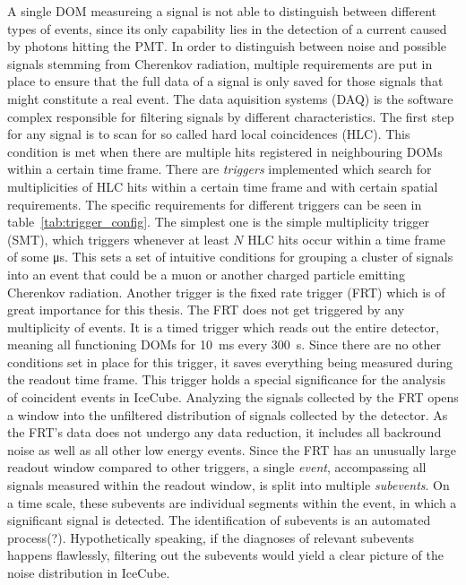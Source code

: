A single DOM measureing a signal is not able to distinguish between different types of events, since its only capability lies in the detection of a current
caused by photons hitting the PMT\@. In order to distinguish between noise and possible signals stemming from Cherenkov radiation, multiple requirements are
put in place to ensure that the full data of a signal is only saved for those signals that might constitute a real event. The data aquisition systems (DAQ)
is the software complex responsible for filtering signals by different characteristics. The first step for any signal is to scan for so called hard local 
coincidences (HLC). This condition is met when there are multiple hits registered in neighbouring DOMs within a certain time frame.
There are \textit{triggers} implemented which search for multiplicities of HLC hits within a certain time frame and with certain spatial requirements.
The specific requirements for different triggers can be seen in table~\ref{tab:trigger_config}.
The simplest one is the simple multiplicity trigger (SMT), which triggers whenever at least $N$ HLC hits occur within a time frame of some 
\si{\micro\second}. This sets a set of intuitive conditions for grouping a cluster of signals into an event that could be a muon or another 
charged particle emitting Cherenkov radiation. 
Another trigger is the fixed rate trigger (FRT) which is of great importance for this thesis. The FRT does not get triggered 
by any multiplicity of events. It is a timed trigger which reads out the entire detector, meaning all functioning DOMs for \SI{10}{ms}
every \SI{300}{s}. Since there are no other conditions set in place for this trigger, it saves everything being measured during the 
readout time frame. This trigger holds a special significance for the analysis of coincident events in IceCube. 
Analyzing the signals collected by the FRT opens a window into the unfiltered distribution of signals collected by the detector. 
As the FRT's data does not undergo any data reduction, it includes all backround noise as well as all other low energy events. 
Since the FRT has an unusually large readout window compared to other triggers, a single \textit{event}, accompassing all signals measured within the readout window,  
is split into multiple \textit{subevents}. On a time scale, these subevents are individual segments within the event, in which a significant signal is detected. 
The identification of subevents is an automated process(?). Hypothetically speaking, if the diagnoses of relevant subevents happens flawlessly, filtering out 
the subevents would yield a clear picture of the noise distribution in IceCube. 



